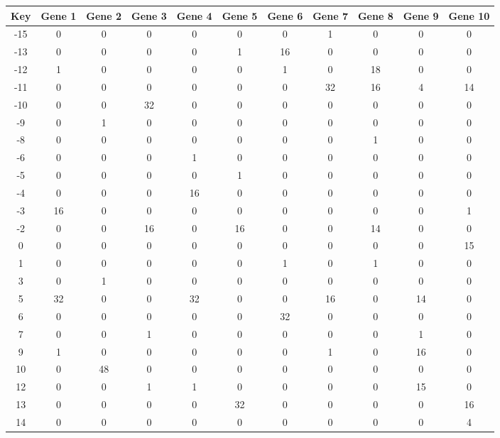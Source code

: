 \begin{tabular}{|c|c|c|c|c|c|c|c|c|c|c|}
\hline
Key & Gene 1 & Gene 2 & Gene 3 & Gene 4 & Gene 5 & Gene 6 & Gene 7 & Gene 8 & Gene 9 & Gene 10 \\
\hline
-15 & 0 & 0 & 0 & 0 & 0 & 0 & 1 & 0 & 0 & 0 \\
-13 & 0 & 0 & 0 & 0 & 1 & 16 & 0 & 0 & 0 & 0 \\
-12 & 1 & 0 & 0 & 0 & 0 & 1 & 0 & 18 & 0 & 0 \\
-11 & 0 & 0 & 0 & 0 & 0 & 0 & 32 & 16 & 4 & 14 \\
-10 & 0 & 0 & 32 & 0 & 0 & 0 & 0 & 0 & 0 & 0 \\
-9 & 0 & 1 & 0 & 0 & 0 & 0 & 0 & 0 & 0 & 0 \\
-8 & 0 & 0 & 0 & 0 & 0 & 0 & 0 & 1 & 0 & 0 \\
-6 & 0 & 0 & 0 & 1 & 0 & 0 & 0 & 0 & 0 & 0 \\
-5 & 0 & 0 & 0 & 0 & 1 & 0 & 0 & 0 & 0 & 0 \\
-4 & 0 & 0 & 0 & 16 & 0 & 0 & 0 & 0 & 0 & 0 \\
-3 & 16 & 0 & 0 & 0 & 0 & 0 & 0 & 0 & 0 & 1 \\
-2 & 0 & 0 & 16 & 0 & 16 & 0 & 0 & 14 & 0 & 0 \\
0 & 0 & 0 & 0 & 0 & 0 & 0 & 0 & 0 & 0 & 15 \\
1 & 0 & 0 & 0 & 0 & 0 & 1 & 0 & 1 & 0 & 0 \\
3 & 0 & 1 & 0 & 0 & 0 & 0 & 0 & 0 & 0 & 0 \\
5 & 32 & 0 & 0 & 32 & 0 & 0 & 16 & 0 & 14 & 0 \\
6 & 0 & 0 & 0 & 0 & 0 & 32 & 0 & 0 & 0 & 0 \\
7 & 0 & 0 & 1 & 0 & 0 & 0 & 0 & 0 & 1 & 0 \\
9 & 1 & 0 & 0 & 0 & 0 & 0 & 1 & 0 & 16 & 0 \\
10 & 0 & 48 & 0 & 0 & 0 & 0 & 0 & 0 & 0 & 0 \\
12 & 0 & 0 & 1 & 1 & 0 & 0 & 0 & 0 & 15 & 0 \\
13 & 0 & 0 & 0 & 0 & 32 & 0 & 0 & 0 & 0 & 16 \\
14 & 0 & 0 & 0 & 0 & 0 & 0 & 0 & 0 & 0 & 4 \\
\hline
\end{tabular}